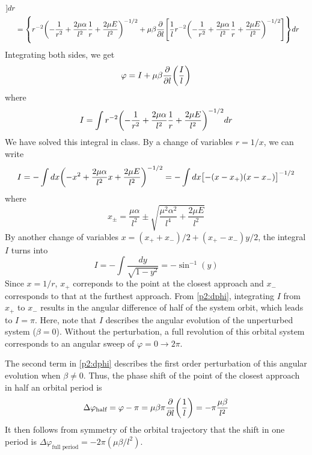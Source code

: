 \documentclass[12pt]{article}
\begin{document}
\begin{problem}{2}
\begin{solution}
\begin{align}
            ]dr\notag\\
            &=\qty{r^{-2}\qty(-\frac1{r^2}+\frac{2\mu\alpha}{l^2}\frac1r
                +\frac{2\mu E}{l^2})^{-1/2}
            +\mu\beta\frac{\partial}{\partial l}\qty[\frac1l
                r^{-2}\qty(-\frac1{r^2}+\frac{2\mu\alpha}{l^2}\frac1r
                +\frac{2\mu E}{l^2})^{-1/2}
            ]
            }dr
        \end{align}
        Integrating both sides, we get
        \begin{equation}\label{p2:dphi}
            \varphi=I+\mu\beta\frac{\partial}{\partial l}\qty(\frac{I}{l}) 
        \end{equation}
        where
        \begin{equation}
            I=\int
                r^{-2}\qty(-\frac1{r^2}+\frac{2\mu\alpha}{l^2}\frac1r+\frac{2\mu
                E}{l^2})^{-1/2}dr
        \end{equation}
        We have solved this integral in class. By a change of variables $r=1/x$,
        we can write
        \begin{equation}
            I=-\int dx\qty(-x^2+\frac{2\mu\alpha}{l^2}x+\frac{2\mu
            E}{l^2})^{-1/2}
            =-\int dx\qty[-(x-x_+)(x-x_-)]^{-1/2}
        \end{equation}
        where
        \begin{equation}
            x_\pm=\frac{\mu\alpha}{l^2}
                \pm\sqrt{\frac{\mu^2\alpha^2}{l^4}+\frac{2\mu E}{l^2}} 
        \end{equation}
        By another change of variables $x=(x_++x_-)/2+(x_+-x_-)y/2$, the
        integral $I$ turns into
        \begin{equation}
            I=-\int\frac{dy}{\sqrt{1-y^2}}=-\sin^{-1}(y)
        \end{equation}
        Since $x=1/r$, $x_+$ correponds to the point at the closest approach and
        $x_-$ corresponds to that at the furthest approach. From
        \eqref{p2:dphi}, integrating $I$ from $x_+$ to $x_-$ results in the
        angular difference of half of the system orbit, which leads to $I=\pi$.
        Here, note that $I$ describes the angular evolution of the unperturbed
        system ($\beta=0$). Without the perturbation, a full revolution of this
        orbital system corresponds to an angular sweep of $\varphi=0\to2\pi$.
        
        The second term in \eqref{p2:dphi} describes the first order
        perturbation of this angular evolution when $\beta\neq0$. Thus, the
        phase shift of the point of the closest approach in half an orbital 
        period is
        \begin{equation}
            \Delta\varphi_{\text{half}}
            =\varphi-\pi=\mu\beta\pi\frac{\partial}{\partial
            l}\qty(\frac1l)=-\pi\frac{\mu\beta}{l^2}
        \end{equation}
        It then follows from symmetry of the orbital trajectory that the shift 
        in one period is
        $\Delta\varphi_{\text{full period}}=-2\pi(\mu\beta/l^2)$.
    \end{solution}
\end{problem}
\end{document}
